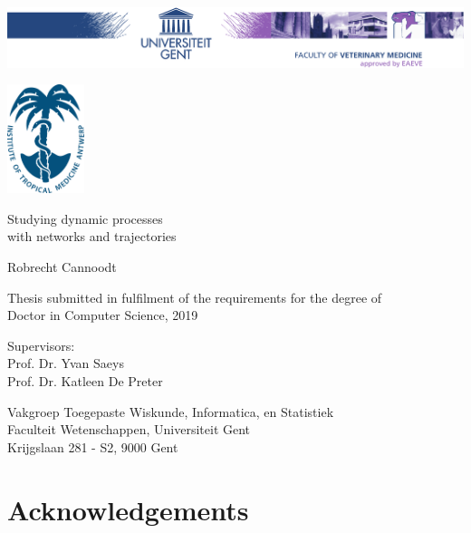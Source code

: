 
\begin{titlepage}
	\centering
	\includegraphics[width=\textwidth]{fig/DI-eps-converted-to.pdf}
	
	\vspace{1cm}
	
	\includegraphics[width=2.25cm]{fig/ITGlogo_new} 
	\vspace{2.25cm}
	
	{\Huge \textsf{Studying dynamic processes\\with networks and trajectories}}
	
	\vspace{2.25cm}
	
	{\LARGE \textsf{Robrecht Cannoodt}}
	
	\vspace{2.25cm}
	
	{\textsf{Thesis submitted in fulfilment of the requirements for the degree of \\Doctor in Computer Science, 2019}}
	
	\vfill
	
	{\textsf{Supervisors: \\
			Prof. Dr. Yvan Saeys\\Prof. Dr. Katleen De Preter}}
	
	\vfill
	
	{\textsf{Vakgroep Toegepaste Wiskunde, Informatica, en Statistiek\\
			Faculteit Wetenschappen, Universiteit Gent \\
			Krijgslaan 281 - S2, 9000 Gent}}
\end{titlepage}


\newpage{\thispagestyle{empty}\cleardoublepage}
\chapter{Acknowledgements}
\blindtext

